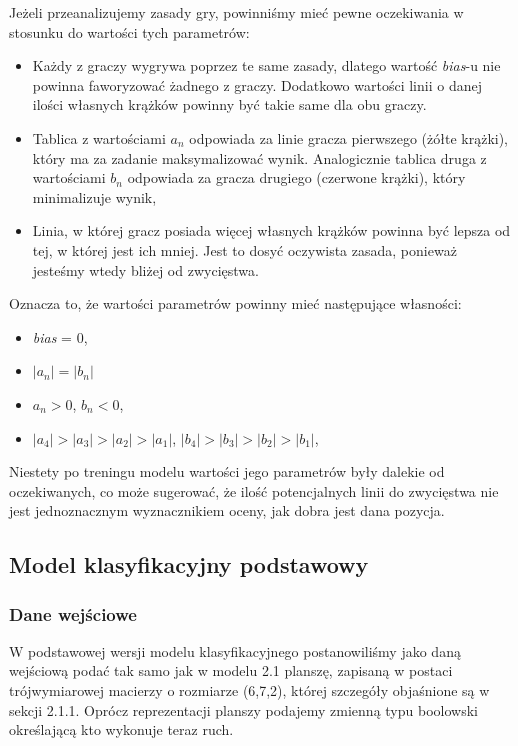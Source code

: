 \documentclass[12pt]{article}
\begin{document}
\noindent Jeżeli przeanalizujemy zasady gry, powinniśmy mieć pewne oczekiwania w stosunku do wartości tych parametrów:

\begin{itemize}
    \item Każdy z graczy wygrywa poprzez te same zasady, dlatego wartość \textit{bias}-u nie powinna faworyzować żadnego z graczy. Dodatkowo wartości linii o danej ilości własnych krążków powinny być takie same dla obu graczy.
    \item Tablica z wartościami $a_n$ odpowiada za linie gracza pierwszego (żółte krążki), który ma za zadanie maksymalizować wynik. Analogicznie tablica druga z wartościami $b_n$ odpowiada za gracza drugiego (czerwone krążki), który minimalizuje wynik,
    \item Linia, w której gracz posiada więcej własnych krążków powinna być lepsza od tej, w której jest ich mniej. Jest to dosyć oczywista zasada, ponieważ jesteśmy wtedy bliżej od zwycięstwa.
\end{itemize}

\noindent Oznacza to, że wartości parametrów powinny mieć następujące własności:

\begin{itemize}
    \item \textit{bias} = 0,
    \item $|a_n| = |b_n|$
    \item $a_n > 0$, $b_n < 0$,
    \item $|a_4| > |a_3| > |a_2| > |a_1|$, $|b_4| > |b_3| > |b_2| > |b_1|$,
\end{itemize}

\noindent Niestety po treningu modelu wartości jego parametrów były dalekie od oczekiwanych, co może sugerować, że ilość potencjalnych linii do zwycięstwa nie jest jednoznacznym wyznacznikiem oceny, jak dobra jest dana pozycja.

\subsection{Model klasyfikacyjny podstawowy}

\subsubsection{Dane wejściowe}

W podstawowej wersji modelu klasyfikacyjnego postanowiliśmy jako daną wejściową podać tak samo jak w modelu 2.1 planszę, zapisaną w postaci trójwymiarowej macierzy o rozmiarze (6,7,2), której szczegóły objaśnione są w sekcji 2.1.1. Oprócz reprezentacji planszy podajemy zmienną typu boolowski określającą kto wykonuje teraz ruch.
\end{document}
